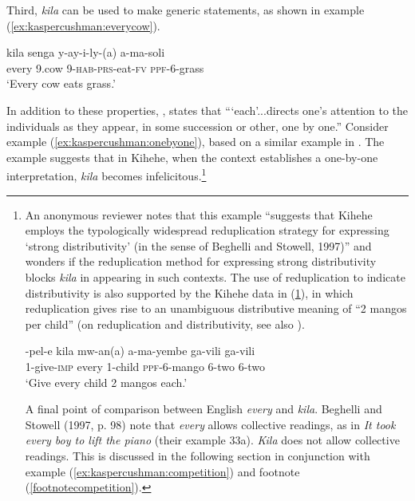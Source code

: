 \documentclass[output=paper,modfonts,nonflat]{langsci/langscibook}
\begin{document}
Third, \emph{kila} can be used to make generic statements, as shown in example (\ref{ex:kaspercushman:everycow}).

\begin{exe}


\ex 
\gll kila senga y-ay-i-ly-(a) a-ma-soli \label{ex:kaspercushman:everycow}\\
every 9.cow 9-\textsc{hab}-\textsc{prs}-eat-\textsc{fv} \textsc{ppf}-6-grass \\
\glt `Every cow eats grass.' 

\end{exe}


In addition to these properties, \citealt[p. 150]{vendler62}, states that ```each'...directs one's attention to the individuals as they appear, in some succession or other, one by one.''  Consider example (\ref{ex:kaspercushman:onebyone}), based on a similar example in \citealt[p. 150]{vendler62}. The example suggests that in Kihehe, when the context establishes a one-by-one interpretation, \textit{kila} becomes infelicitous.\footnote{An anonymous reviewer notes that this example ``suggests that Kihehe employs the typologically widespread reduplication strategy for expressing `strong distributivity' (in the sense of Beghelli and Stowell, 1997)'' and wonders if the reduplication method for expressing strong distributivity blocks \textit{kila} in appearing in such contexts. The use of reduplication to indicate distributivity is also supported by the Kihehe data in (\ref{mangos}), in which reduplication gives rise to an unambiguous distributive meaning of ``2 mangos per child'' (on reduplication and distributivity, see also \citealt{balusu13}). 
\begin{exe}
\ex \label{mangos} 
\gll {}-pel-e kila mw-an(a) a-ma-yembe ga-vili ga-vili \\
1-give-\textsc{imp} every 1-child \textsc{ppf}-6-mango 6-two 6-two \\
\glt `Give every child 2 mangos each.' \\
\end{exe}

A final point of comparison between English \textit{every} and \textit{kila}. Beghelli and Stowell (1997, p. 98) note that \textit{every} allows collective readings, as in \textit{It took every boy to lift the piano} (their example 33a). \textit{Kila} does not allow collective readings. This is discussed in the following section in conjunction with example (\ref{ex:kaspercushman:competition}) and footnote (\ref{footnotecompetition}).}
\end{document}
